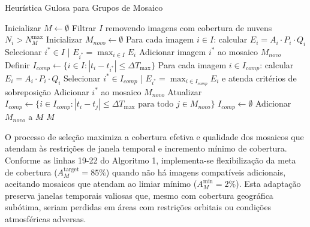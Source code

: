\documentclass[a4paper,11pt]{article}
\begin{document}
\begin{algorithm}[H]
    \caption{Heurística Gulosa para Grupos de Mosaico}
    \label{alg:Heurística Gulosa para Grupos de Mosaico}
    \begin{algorithmic}[1]
    \State Inicializar $M \gets \emptyset$
    \State Filtrar $I$ removendo imagens com cobertura de nuvens $N_i > N_M^{\max}$ 
        \State Inicializar $M_{novo} \gets \emptyset$ 
        \State Para cada imagem $i \in I$: calcular $E_i = A_i \cdot P_i \cdot Q_i$ 
        \State Selecionar $i^* \in I$ | $E_{i^*} = \max_{i \in I} E_i$ 
        \State Adicionar imagem $i^*$ ao mosaico $M_{novo}$
        \State Definir $I_{comp} \gets \{i \in I : |t_i - t_{i^*}| \leq \Delta T_{\max}\}$
            \State Para cada imagem $i \in I_{comp}$: calcular $E_i = A_i \cdot P_i \cdot Q_i$
            \State Selecionar $i^* \in I_{comp}$ | $E_{i^*} = \max_{i \in I_{comp}} E_i$ e atenda critérios de sobreposição
                \State Adicionar $i^*$ ao mosaico $M_{novo}$
                \State Atualizar $I_{comp} \gets \{i \in I_{comp} : |t_i - t_j| \leq \Delta T_{\max} \text{ para todo } j \in M_{novo}\}$
            \Else
                \State $I_{comp} \gets \emptyset$
            \EndIf
        \EndWhile
                \State Adicionar $M_{novo}$ a $M$
            \EndIf
        \EndIf
    \EndWhile
    \State \Return $M$
    \end{algorithmic}
\end{algorithm}
\vspace{-5mm}
O processo de seleção maximiza a cobertura efetiva e qualidade dos mosaicos que atendam às restrições de janela temporal e incremento mínimo de cobertura. Conforme as linhas 19-22 do Algoritmo 1, implementa-se flexibilização da meta de cobertura ($A_M^{\text{target}} = 85\%$) quando não há imagens compatíveis adicionais, aceitando mosaicos que atendam ao limiar mínimo ($A_M^{\min} = 2\%$). Esta adaptação preserva janelas temporais valiosas que, mesmo com cobertura geográfica subótima, seriam perdidas em áreas com restrições orbitais ou condições atmosféricas adversas.
\vspace{-5mm}
\end{document}
